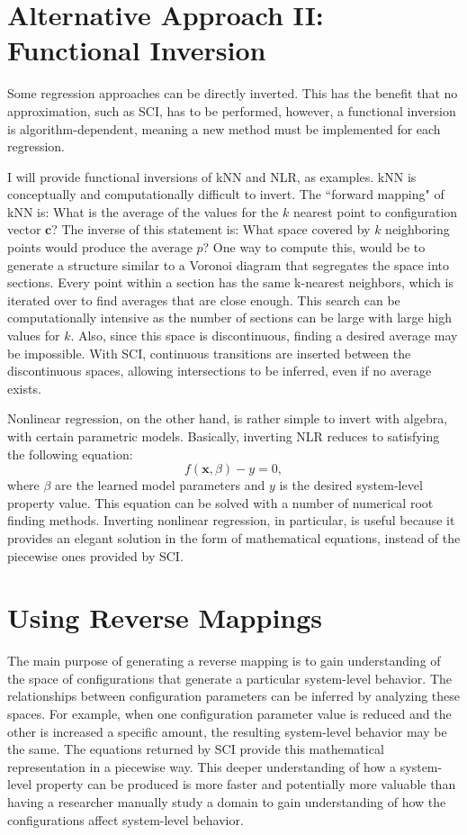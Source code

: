 \section{Alternative Approach II: Functional Inversion}\label{sec:functional}

Some regression approaches can be directly inverted.
This has the benefit that no approximation, such as SCI, has to be performed, however, a functional inversion is algorithm-dependent, meaning a new method must be implemented for each regression.

I will provide functional inversions of kNN and NLR, as examples.
kNN is conceptually and computationally difficult to invert.
The ``forward mapping" of kNN is:
What is the average of the values for the $k$ nearest point to configuration vector $\mathbf c$?
The inverse of this statement is:
What space covered by $k$ neighboring points would produce the average $p$?
One way to compute this, would be to generate a structure similar to a Voronoi diagram that segregates the space into sections.
Every point within a section has the same k-nearest neighbors, which is iterated over to find averages that are close enough.
This search can be computationally intensive as the number of sections can be large with large high values for $k$.
Also, since this space is discontinuous, finding a desired average may be impossible.
With SCI, continuous transitions are inserted between the discontinuous spaces, allowing intersections to be inferred, even if no average exists.

Nonlinear regression, on the other hand, is rather simple to invert with algebra, with certain parametric models.
Basically, inverting NLR reduces to satisfying the following equation:
\[f(\mathbf x, \beta) - y = 0,\]
where $\beta$ are the learned model parameters and $y$ is the desired system-level property value.
This equation can be solved with a number of numerical root finding methods.
Inverting nonlinear regression, in particular, is useful because it provides an elegant solution in the form of mathematical equations, instead of the piecewise ones provided by SCI.


\section{Using Reverse Mappings}
The main purpose of generating a reverse mapping is to gain understanding of the space of configurations that generate a particular system-level behavior.
The relationships between configuration parameters can be inferred by analyzing these spaces.
For example, when one configuration parameter value is reduced and the other is increased a specific amount, the resulting system-level behavior may be the same.
The equations returned by SCI provide this mathematical representation in a piecewise way.
This deeper understanding of how a system-level property can be produced is more faster and potentially more valuable than having a researcher manually study a domain to gain understanding of how the configurations affect system-level behavior.

